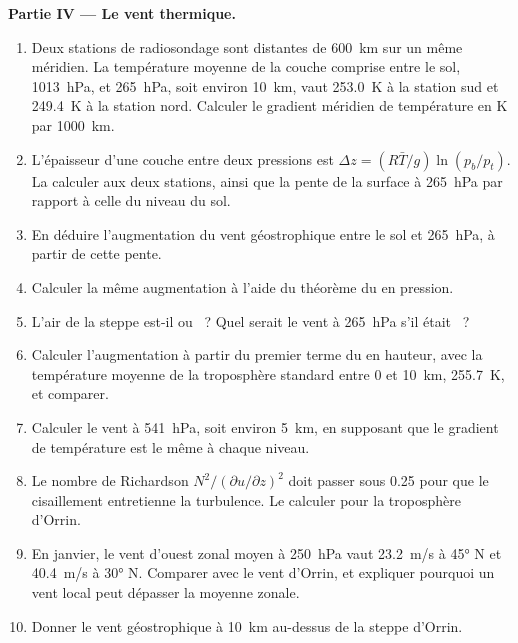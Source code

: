 \begin{problem}
\medskip\noindent\textbf{Partie IV --- Le vent thermique.}
\begin{enumerate}[resume]
\item Deux stations de radiosondage sont distantes de \qty{600}{km} sur un même
  méridien. La température moyenne de la couche comprise entre le sol,
  \qty{1013}{hPa}, et \qty{265}{hPa}, soit environ \qty{10}{km}, vaut \qty{253.0}{K}
  à la station sud et \qty{249.4}{K} à la station nord. Calculer le
  gradient méridien de température en \unit{K} par \qty{1000}{km}.
\item L'épaisseur d'une couche entre deux pressions est $\Delta z = (R\bar
  T/g)\ln(p_b/p_t)$. La calculer aux deux stations, ainsi que la pente de la
  surface à \qty{265}{hPa} par rapport à celle du niveau du sol.
\item En déduire l'augmentation du vent géostrophique entre le sol et
  \qty{265}{hPa}, à partir de cette pente.
\item Calculer la même augmentation à l'aide du théorème du  en pression.
\item L'air de la steppe est-il  ou ~? Quel serait le vent
  à \qty{265}{hPa} s'il était ~?
\item Calculer l'augmentation à partir du premier terme du  en
  hauteur, avec la température moyenne de la troposphère standard entre 0
  et \qty{10}{km}, \qty{255.7}{K}, et comparer.
\item Calculer le vent à \qty{541}{hPa}, soit environ \qty{5}{km}, en supposant que le
  gradient de température est le même à chaque niveau.
\item Le nombre de Richardson $N^2/(\partial u/\partial z)^2$ doit passer sous
  0.25 pour que le cisaillement entretienne la turbulence. Le calculer pour la
  troposphère d'Orrin.
\item En janvier, le vent d'ouest zonal moyen à \qty{250}{hPa} vaut \qty{23.2}{m/s}
  à \ang{45} N et \qty{40.4}{m/s} à \ang{30} N. Comparer avec le vent
  d'Orrin, et expliquer pourquoi un vent local peut dépasser la moyenne zonale.
\item Donner le vent géostrophique à \qty{10}{km} au-dessus de la steppe d'Orrin.
\end{enumerate}
\end{problem}
